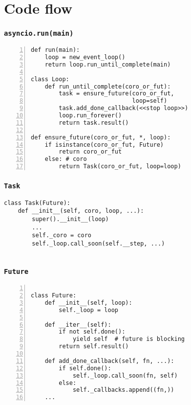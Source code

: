 \documentclass[compress,usenames,dvipsnames]{beamer}
\begin{document}
\section{Code flow}

\begin{frame}
    \frametitle{\lstinline{asyncio.run(main)}}
    \begin{lstlisting}[numbers=left]
def run(main):
    loop = new_event_loop()
    return loop.run_until_complete(main)

class Loop:
    def run_until_complete(coro_or_fut):
        task = ensure_future(coro_or_fut,
                             loop=self)
        task.add_done_callback(<<stop loop>>)
        loop.run_forever()
        return task.result()

def ensure_future(coro_or_fut, *, loop):
    if isinstance(coro_or_fut, Future)
        return coro_or_fut
    else: # coro
        return Task(coro_or_fut, loop=loop)

    \end{lstlisting}
\end{frame}

\begin{frame}
    \frametitle{\lstinline{Task}}
    \begin{lstlisting}
class Task(Future):
    def __init__(self, coro, loop, ...):
        super().__init__(loop)
        ...
        self._coro = coro
        self._loop.call_soon(self.__step, ...)
    
    \end{lstlisting}
\end{frame}

\begin{frame}
    \frametitle{\lstinline{Future}}
    \scriptsize
    \begin{lstlisting}[numbers=left]

class Future:
    def __init__(self, loop):
        self._loop = loop

    def __iter__(self):
        if not self.done():
            yield self  # future is blocking
        return self.result()

    def add_done_callback(self, fn, ...):
        if self.done():
            self._loop.call_soon(fn, self)
        else:
            self._callbacks.append((fn,))
    ...

    \end{lstlisting}
\end{frame}
\end{document}
